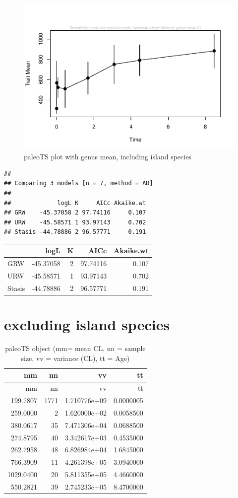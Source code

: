 \documentclass[]{article}
\begin{document}
\begin{figure}[htbp]
\centering
\includegraphics{MA_JJ_files/figure-latex/paleoTS plot with genus mean, including island species-1.pdf}
\caption{paleoTS plot with genus mean, including island species}
\end{figure}

\begin{verbatim}
## 
## Comparing 3 models [n = 7, method = AD]
## 
##             logL K     AICc Akaike.wt
## GRW    -45.37058 2 97.74116     0.107
## URW    -45.58571 1 93.97143     0.702
## Stasis -44.78886 2 96.57771     0.191
\end{verbatim}

\begin{longtable}[]{@{}lrrrr@{}}
\toprule
& logL & K & AICc & Akaike.wt\tabularnewline
\midrule
\endhead
GRW & -45.37058 & 2 & 97.74116 & 0.107\tabularnewline
URW & -45.58571 & 1 & 93.97143 & 0.702\tabularnewline
Stasis & -44.78886 & 2 & 96.57771 & 0.191\tabularnewline
\bottomrule
\end{longtable}

\section{excluding island species}\label{excluding-island-species}

\begin{longtable}[]{@{}rrrr@{}}
\caption{paleoTS object (mm= mean CL, nn = sample size, vv = variance
(CL), tt = Age)}\tabularnewline
\toprule
mm & nn & vv & tt\tabularnewline
\midrule
\endfirsthead
\toprule
mm & nn & vv & tt\tabularnewline
\midrule
\endhead
199.7807 & 1771 & 1.710776e+09 & 0.0000005\tabularnewline
259.0000 & 2 & 1.620000e+02 & 0.0058500\tabularnewline
380.0617 & 35 & 7.471306e+04 & 0.0688500\tabularnewline
274.8795 & 40 & 3.342617e+03 & 0.4535000\tabularnewline
262.7958 & 48 & 6.826984e+04 & 1.6845000\tabularnewline
766.3909 & 11 & 4.261398e+05 & 3.0940000\tabularnewline
1029.0400 & 20 & 5.811355e+05 & 4.4660000\tabularnewline
550.2821 & 39 & 2.745233e+05 & 8.4700000\tabularnewline
\bottomrule
\end{longtable}
\end{document}

